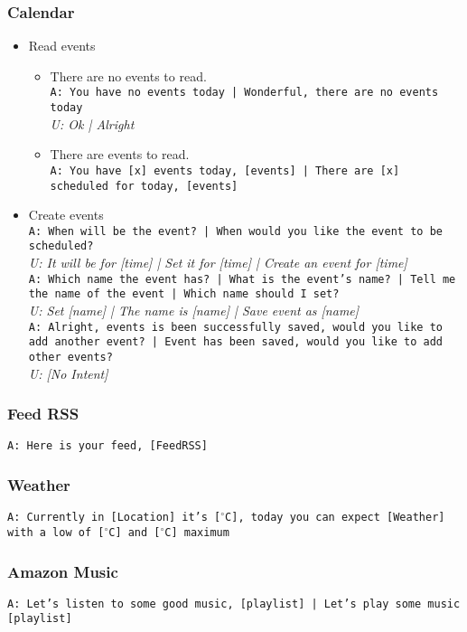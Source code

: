 \subsubsection{Calendar}
\begin{itemize}
	\item Read events
	\begin{itemize}
		\item There are no events to read.\\
		\texttt{A: You have no events today | Wonderful, there are no events today}\\
		\textit{U: Ok | Alright}
		\item There are events to read.\\
		\texttt{A: You have [x] events today, [events] | There are [x] scheduled for today, [events]}
	\end{itemize}
	\item Create events\\
	\texttt{A: When will be the event? | When would you like the event to be scheduled?}\\
	\textit{U: It will be for [time] | Set it for [time] | Create an event for [time]}\\
	\texttt{A: Which name the event has? | What is the event's name? | Tell me the name of the event | Which name should I set?}\\
	\textit{U: Set [name] | The name is [name] | Save event as [name]}\\
	\texttt{A: Alright, events is been successfully saved, would you like to add another event? | Event has been saved, would you like to add other events?}\\
	\textit{U: [No Intent]}
\end{itemize}

\subsubsection{Feed RSS}
\texttt{A: Here is your feed, [FeedRSS]}

\subsubsection{Weather}
\texttt{A: Currently in [Location] it’s [$^\circ$C], today you can expect [Weather] with a low of [$^\circ$C] and [$^\circ$C] maximum}

\subsubsection{Amazon Music}
\texttt{A: Let's listen to some good music, [playlist] | Let's play some music [playlist]}

